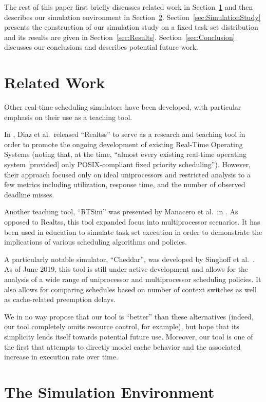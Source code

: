 \documentclass[11pt]{article}
\newcommand{\secref}[1]{Section~\ref{#1}}
\begin{document}
The rest of this paper first briefly discusses related work in
\secref{sec:RelatedWork} and then describes our simulation environment in
\secref{sec:SimulationEnvironment}. \secref{sec:SimulationStudy} presents the construction of our simulation study on a fixed task set distribution and its results are given in \secref{sec:Results}. \secref{sec:Conclusion} discusses our
conclusions and describes potential future work.

\section{Related Work}
\label{sec:RelatedWork}

Other real-time scheduling simulators have been developed, with particular emphasis on their use as a teaching tool.

In \cite{Diaz}, Diaz et al.\ released ``Realtss'' to serve as a research and teaching tool in order to promote the ongoing development of existing Real-Time Operating Systems (noting that, at the time, ``almost every existing real-time operating system [provided] only POSIX-compliant fixed priority scheduling''). However, their approach focused only on ideal uniprocessors and restricted analysis to a few metrics including utilization, response time, and the number of observed deadline misses.

Another teaching tool, ``RTSim'' was presented by Manacero et al.\ in \cite{Manacero}. As opposed to Realtss, this tool expanded focus into multiprocessor scenarios. It has been used in education to simulate task set execution in order to demonstrate the implications of various scheduling algorithms and policies.

A particularly notable simulator, ``Cheddar'', was developed by Singhoff et al.\ \cite{Singhoff}. As of June 2019, this tool is still under active development and allows for the analysis of a wide range of uniprocessor and multiprocessor scheduling policies. It also allows for comparing schedules based on number of context switches as well as cache-related preemption delays.

We in no way propose that our tool is ``better'' than these alternatives (indeed, our tool completely omits resource control, for example), but hope that its simplicity lends itself towards potential future use. Moreover, our tool is one of the first that attempts to directly model cache behavior and the associated increase in execution rate over time.

\section{The Simulation Environment} %
\label{sec:SimulationEnvironment} 
\end{document}
